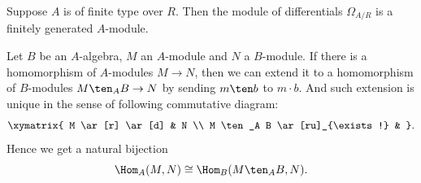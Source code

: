     \begin{corollary}\label{cor: module of differentials is finite}
        Suppose \(A\) is of finite type over \(R\).
        Then the module of differentials \(\Omega_{A/R}\) is a finitely generated \(A\)-module.
    \end{corollary}
    
    \begin{remark}\label{rmk: extending homomorphisms (M to N) to tensor products (M ten B to N)}
        Let $B$ be an $A$-algebra, $M$ an \(A\)-module and \(N\) a \(B\)-module.
        If there is a homomorphism of \(A\)-modules \(M \to N\), then we can extend it to a homomorphism of \(B\)-modules \(M \ten_A B \to N\) by sending \(m \ten b\) to \(m \cdot b\).
        And such extension is unique in the sense of following commutative diagram:
        \[
            \xymatrix{
                M \ar[r] \ar[d] & N \\
                M \ten_A B \ar[ru]_{\exists!} & 
            }.
        \]
        Hence we get a natural bijection 
        \[ \Hom_A(M, N) \cong \Hom_B(M \ten_A B, N). \]
    \end{remark}

    
    

